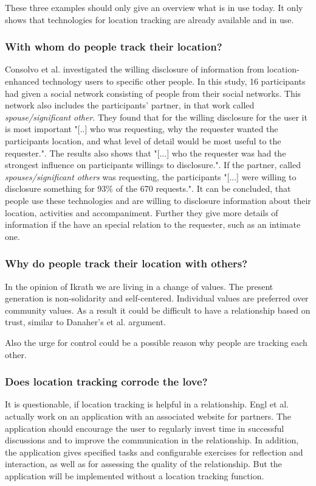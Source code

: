 These three examples should only give an overview what is in use today. 
It only shows that technologies for location tracking are already available and in use.

\subsubsection{With whom do people track their location?}
Consolvo et al. \cite{Consolvo:2005:LDS:1054972.1054985}  investigated the willing disclosure of information from location-enhanced technology users to specific other people. In this study, 16 participants had given a social network consisting of people from their social networks. This network also includes the participants' partner, in that work called \textit{spouse/significant other}. They found that for the willing disclosure for the user it is most important "[..] who was requesting, why the requester wanted the participants location, and what level of detail would be most useful to the requester.". The results also shows that "[...] who the requester was had the strongest influence on participants willings to disclosure.". If the partner, called \textit{spouses/significant others} was requesting, the participants "[...] were willing to disclosure something for 93\% of the 670 requests.".
It can be concluded, that people use these technologies and are willing to disclosure information about their location, activities and accompaniment. Further they give more details of information if the have an special relation to the requester, such as an intimate one.

\subsubsection{Why do people track their location with others?}

In the opinion of Ikrath \cite{Ikrath2018} we are living in a change of values. The present generation is non-solidarity and self-centered. Individual values are preferred over community values.  
As a result it could be difficult to have a relationship based on trust, similar to Danaher's et al. \cite{doi:10.1080/15265161.2017.1409823} argument.

Also the urge for control could be a possible reason why people are tracking each other.

\subsubsection{Does location tracking corrode the love?}
It is questionable, if location tracking is helpful in a relationship.
Engl et al. \cite{engl2016} actually work on an application with an associated website for partners.
The application should encourage the user to regularly invest time in successful discussions and to improve the communication in the relationship.
In addition, the application gives specified tasks and configurable exercises for reflection and interaction, as well as for assessing the quality of the relationship.
But the application will be implemented without a location tracking function.

